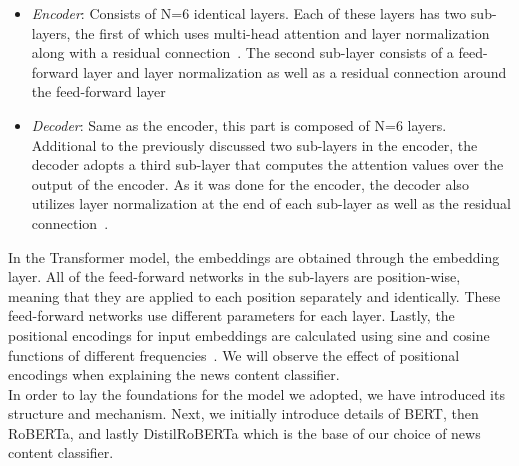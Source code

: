 \begin{itemize}
    \item \emph{Encoder}: Consists of N=6 identical layers. Each of these layers has two sub-layers, the first of which uses multi-head attention and layer normalization~\parencite{LayerNorm_Ba} along with a residual connection~\parencite{ResidualConnection_He}. The second sub-layer consists of a feed-forward layer and layer normalization as well as a residual connection around the feed-forward layer~\parencite{AttentionIsAllYouNeed_Vaswani}
    \item \emph{Decoder}: Same as the encoder, this part is composed of N=6 layers. Additional to the previously discussed two sub-layers in the encoder, the decoder adopts a third sub-layer that computes the attention values over the output of the encoder. As it was done for the encoder, the decoder also utilizes layer normalization at the end of each sub-layer as well as the residual connection~\parencite{AttentionIsAllYouNeed_Vaswani}.
\end{itemize}
In the Transformer model, the embeddings are obtained through the embedding layer. All of the feed-forward networks in the sub-layers are position-wise, meaning that they are applied to each position separately and identically. These feed-forward networks use different parameters for each layer. Lastly, the positional encodings for input embeddings are calculated using sine and cosine functions of different frequencies~\parencite{AttentionIsAllYouNeed_Vaswani}. We will observe the effect of positional encodings when explaining the news content classifier.\\
In order to lay the foundations for the model we adopted, we have introduced its structure and mechanism. Next, we initially introduce details of BERT, then RoBERTa, and lastly DistilRoBERTa which is the base of our choice of news content classifier.

